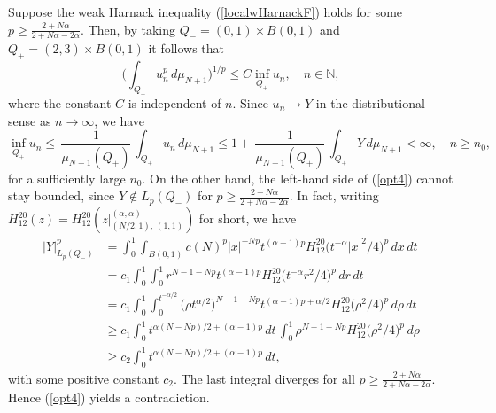 \documentclass[10pt]{article}
\newcommand{\iN}{\mathbb{N}}
\begin{document}
Suppose the weak Harnack inequality (\ref{localwHarnackF}) holds for
some $p\ge \frac{2+N\alpha}{2+N\alpha-2\alpha}$. Then, by taking
$Q_-=(0,1)\times B(0,1)$ and $Q_+=(2,3)\times B(0,1)$ it follows
that
\begin{equation} \label{opt4}
\big(\int_{Q_-}u_n^p\,d\mu_{N+1}\big)^{1/p}\le C \inf_{Q_+}
u_n,\quad n\in \iN,
\end{equation}
where the constant $C$ is independent of $n$. Since $u_n\to Y$ in
the distributional sense as $n\to \infty$, we have
\[
\inf_{Q_+} u_n\le \,\frac{1}{\mu_{N+1}(Q_+)}\,\int_{Q_+}u_n
\,d\mu_{N+1}\le 1+ \,\frac{1}{\mu_{N+1}(Q_+)}\,\int_{Q_+}Y
\,d\mu_{N+1}<\infty,\quad n\ge n_0,
\]
for a sufficiently large $n_0$. On the other hand, the left-hand
side of (\ref{opt4}) cannot stay bounded, since $Y\notin L_p(Q_-)$
for $p\ge \frac{2+N\alpha}{2+N\alpha-2\alpha}$. In fact, writing
$H^{20}_{12}(z)=H^{20}_{12}(z|{}^{(\alpha,\alpha)}_{(N/2,1),\,(1,1)})$
for short, we have
\begin{align*}
|Y|_{L_p(Q_-)}^p & = \int_0^1 \int_{B(0,1)} c(N)^p
|x|^{-Np}t^{(\alpha-1)p}
H^{20}_{12}\big(t^{-\alpha}|x|^2/4\big)^p\,dx\,dt\\
& = c_1 \int_0^1 \int_0^1
r^{N-1-Np}t^{(\alpha-1)p}H^{20}_{12}\big(t^{-\alpha}r^2/4\big)^p\,dr\,dt\\
& = c_1 \int_0^1 \int_0^{t^{-\alpha/2}}\big(\rho
t^{\alpha/2})^{N-1-Np}t^{(\alpha-1)p+\alpha/2}H^{20}_{12}\big(\rho^2/4\big)^p\,d\rho\,dt\\
& \ge c_1 \int_0^1 t^{\alpha(N-Np)/2+(\alpha-1)p}\,dt \,\int_0^1
\rho^{N-1-Np}H^{20}_{12}\big(\rho^2/4\big)^p\,d\rho\\
& \ge c_2 \int_0^1 t^{\alpha(N-Np)/2+(\alpha-1)p}\,dt,
\end{align*}
with some positive constant $c_2$. The last integral diverges for
all $p\ge \frac{2+N\alpha}{2+N\alpha-2\alpha}$. Hence (\ref{opt4})
yields a contradiction.
\end{document}
